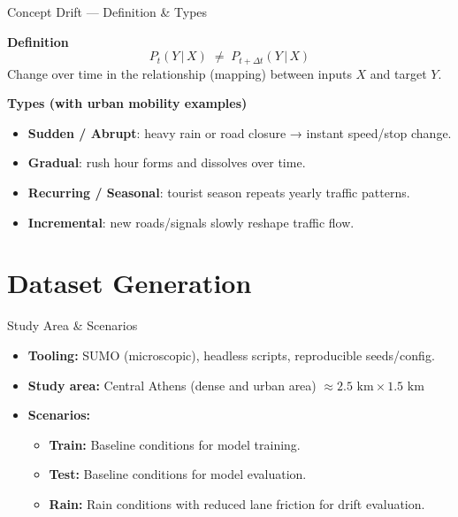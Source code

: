 \documentclass[aspectratio=169,11pt]{beamer}
\begin{document}
\begin{frame}{Concept Drift — Definition \& Types}

    \textbf{Definition}
    \[
        P_t(Y\,|\,X)\;\neq\;P_{t+\Delta t}(Y\,|\,X)
    \]
    \small Change over time in the relationship (mapping) between inputs $X$ and target $Y$.\normalsize

    \vspace{0.6em}
    \textbf{Types (with urban mobility examples)}
    \begin{itemize}
        \item \textbf{Sudden / Abrupt}: heavy rain or road closure → instant speed/stop change.
        \item \textbf{Gradual}: rush hour forms and dissolves over time.
        \item \textbf{Recurring / Seasonal}: tourist season repeats yearly traffic patterns.
        \item \textbf{Incremental}: new roads/signals slowly reshape traffic flow.
    \end{itemize}

\end{frame}

\section{Dataset Generation}

\begin{frame}{Study Area \& Scenarios}
    \begin{itemize}
        \item \textbf{Tooling:} SUMO (microscopic), headless scripts, reproducible seeds/config.
            \medskip
        \item \textbf{Study area:} Central Athens (dense and urban area) $\approx 2.5 \text{ km} \times 1.5 \text{ km}$
            \medskip
        \item \textbf{Scenarios:}
            \medskip
            \begin{itemize}
                \item \textbf{Train:} Baseline conditions for model training.
                    \medskip
                \item \textbf{Test:} Baseline conditions for model evaluation.
                    \medskip
                \item \textbf{Rain:} Rain conditions with reduced lane friction for drift evaluation.
            \end{itemize}
    \end{itemize}
\end{frame}
\end{document}
